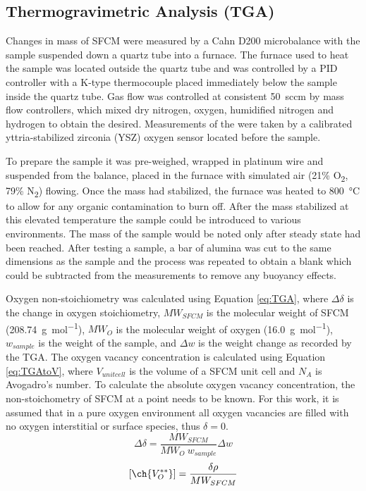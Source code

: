     \subsection{Thermogravimetric Analysis (TGA)}
        Changes in mass of SFCM were measured by a Cahn D200 microbalance with the sample suspended down a quartz tube into a furnace.
        The furnace used to heat the sample was located outside the quartz tube and was controlled by a PID controller with a K-type thermocouple placed immediately below the sample inside the quartz tube.
        Gas flow was controlled at consistent \SI{50}{sccm} by mass flow controllers, which mixed dry nitrogen, oxygen, humidified nitrogen and hydrogen to obtain the  desired.
        Measurements of the  were taken by a calibrated yttria-stabilized zirconia (YSZ) oxygen sensor located before the sample.

        To prepare the sample it was pre-weighed, wrapped in platinum wire and suspended from the balance, placed in the furnace with simulated air (21\% O\textsubscript{2}, 79\% N\textsubscript{2}) flowing.
        Once the mass had stabilized, the furnace was heated to \SI{800}{\celsius} to allow for any organic contamination to burn off.
        After the mass stabilized at this elevated temperature the sample could be introduced to various environments.
        The mass of the sample would be noted only after steady state had been reached.
        After testing a sample, a bar of alumina was cut to the same dimensions as the sample and the process was repeated to obtain a blank which could be subtracted from the measurements to remove any buoyancy effects.

        Oxygen non-stoichiometry was calculated using Equation \ref{eq:TGA}, where $\Delta\delta$ is the change in oxygen stoichiometry, $MW_{SFCM}$ is the molecular weight of SFCM (\SI{208.74}{\gram\per\mol}), $MW_O$ is the molecular weight of oxygen (\SI{16.0}{\gram\per\mol}), $w_{sample}$ is the weight of the sample, and $\Delta{}w$ is the weight change as recorded by the TGA.
        The oxygen vacancy concentration is calculated using Equation \ref{eq:TGAtoV}, where $V_{unit cell}$ is the volume of a SFCM unit cell and $N_A$ is Avogadro's number.
        To calculate the absolute oxygen vacancy concentration, the non-stoichometry of SFCM at a point needs to be known.
        For this work, it is assumed that in a pure oxygen environment all oxygen vacancies are filled with no oxygen interstitial or surface species, thus $\delta = 0$.
        \begin{equation}
            \Delta\delta = \frac{MW_{SFCM}}{MW_O\ w_{sample}}\Delta{}w
            \label{eq:TGA}
        \end{equation}
        \begin{equation}
            \lbrack\ch{V_O^{**}}\rbrack =\frac{\delta\rho}{MW_{SFCM}}
            \label{eq:TGAtoV}
        \end{equation}

